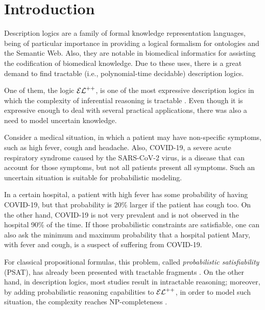 
\chapter{Introduction}
\label{cap:introduction}

Description logics are a family of formal knowledge representation languages, being of particular importance in providing a logical formalism for ontologies and the Semantic Web. Also, they are notable in biomedical informatics for assisting the codification of biomedical knowledge. Due to these uses, there is a great demand to find tractable (i.e., polynomial-time decidable) description logics.

One of them, the logic $\mathcal{EL}^{++}$, is one of the most expressive description logics in which the complexity of inferential reasoning is tractable \citep{Baader2005a}. Even though it is expressive enough to deal with several practical applications, there was also a need to model uncertain knowledge.

\begin{example}
  \label{exmp:real-example}
Consider a medical situation, in which a patient may have non-specific symptoms, such as high fever, cough and headache. Also, COVID-19, a severe acute respiratory syndrome caused by the  SARS-CoV-2 virus, is a disease that can account for those symptoms, but not all patients present all symptoms. Such an uncertain situation is suitable for probabilistic modeling.

In a certain hospital, a patient with high fever has some probability of having COVID-19, but that probability is 20\% larger if the patient has cough too. On the other hand, COVID-19 is not very prevalent and is not observed in the hospital 90\% of the time. If those probabilistic constraints are satisfiable, one can also ask the minimum and maximum probability that a hospital patient Mary, with fever and cough, is a suspect of suffering from COVID-19.
\end{example}

For classical propositional formulas, this problem, called \emph{probabilistic satisfiability} (PSAT), has already been presented with tractable fragments \citep{andersen2001easy}. On the other hand, in description logics, most studies result in intractable reasoning; moreover, by adding probabilistic reasoning capabilities to $\mathcal{EL}^{++}$, in order to model such situation, the complexity reaches NP-completeness \citep{Fin2019b}.

